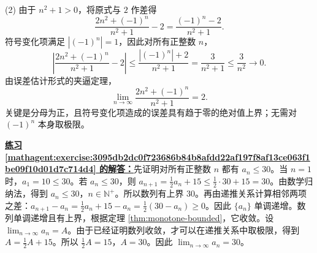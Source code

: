\documentclass[UTF8,fontset=fandol,11pt]{ctexart}
\begin{document}
(2) 由于 $n^2+1>0$，将原式与 $2$ 作差得
\[
\frac{2n^2+(-1)^n}{n^2+1}-2
=\frac{(-1)^n-2}{n^2+1}.
\]
符号变化项满足 $|(-1)^n|=1$，因此对所有正整数 $n$，
\[
\left|\frac{2n^2+(-1)^n}{n^2+1}-2\right|
\leq\frac{|(-1)^n|+2}{n^2+1}
=\frac3{n^2+1}\leq\frac3{n^2}\to0.
\]
由误差估计形式的夹逼定理，
\[
\lim_{n\to\infty}\frac{2n^2+(-1)^n}{n^2+1}=2.
\]
关键是分母为正，且符号变化项造成的误差具有趋于零的绝对值上界；无需对 $(-1)^n$ 本身取极限。\par
\par\noindent\textbf{\hyperref[mathagent:exercise:3095db2dc0f723686b84b8afdd22af197f8af13ce063f1be09f10d01d7c714d4]{练习 \ref*{mathagent:exercise:3095db2dc0f723686b84b8afdd22af197f8af13ce063f1be09f10d01d7c714d4} 的解答：}}先证明对所有正整数 $n$ 都有 $a_n\leq30$。当 $n=1$ 时，$a_1=10\leq30$。若 $a_n\leq30$，则 $a_{n+1}=\frac12a_n+15\leq\frac12\cdot30+15=30$。由数学归纳法，得到 $a_n\leq30$，$n\in\mathbb{N}^{+}$。所以数列有上界 $30$。再由递推关系计算相邻两项之差：$a_{n+1}-a_n=\frac12a_n+15-a_n=\frac12(30-a_n)\geq0$。因此 $\{a_n\}$ 单调递增。数列单调递增且有上界，根据定理 \ref{thm:monotone-bounded}，它收敛。设 $\lim_{n\to\infty}a_n=A$。由于已经证明数列收敛，才可以在递推关系中取极限，得到 $A=\frac12A+15$。所以 $\frac12A=15$，$A=30$。因此 $\lim_{n\to\infty}a_n=30$。\par
\end{document}
